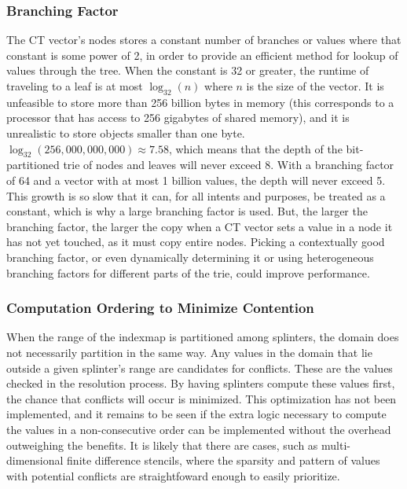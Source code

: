 \documentclass[pageno]{jpaper}
\begin{document}
\subsubsection{Branching Factor}
The CT vector's nodes stores a constant number of branches or values where that
constant is some power of 2, in order to provide an efficient method for lookup
of values through the tree. When the constant is 32 or greater, the runtime of
traveling to a leaf is at most $\log_{32}(n)$ where $n$ is the size of the
vector. It is unfeasible to store more than 256 billion bytes in memory (this
corresponds to a processor that has access to 256 gigabytes of shared memory),
and it is unrealistic to store objects smaller than one byte.
$\log_{32}(256,000,000,000) \approx 7.58$, which means that the depth of the
bit-partitioned trie of nodes and leaves will never exceed 8. With a branching
factor of 64 and a vector with at most 1 billion values, the depth will never
exceed 5. This growth is so slow that it can, for all intents and purposes, be
treated as a constant, which is why a large branching factor is used. But, the
larger the branching factor, the larger the copy when a CT vector sets a value
in a node it has not yet touched, as it must copy entire nodes. Picking a
contextually good branching factor, or even dynamically determining it or using
heterogeneous branching factors for different parts of the trie, could improve
performance.

\subsubsection{Computation Ordering to Minimize Contention}
When the range of the indexmap is partitioned among splinters, the domain does
not necessarily partition in the same way. Any values in the domain that lie
outside a given splinter's range are candidates for conflicts. These are the
values checked in the resolution process. By having splinters compute these
values first, the chance that conflicts will occur is minimized. This
optimization has not been implemented, and it remains to be seen if the extra
logic necessary to compute the values in a non-consecutive order can be
implemented without the overhead outweighing the benefits.  It is likely that
there are cases, such as multi-dimensional finite difference stencils, where the
sparsity and pattern of values with potential conflicts are straightfoward
enough to easily prioritize.
\end{document}
